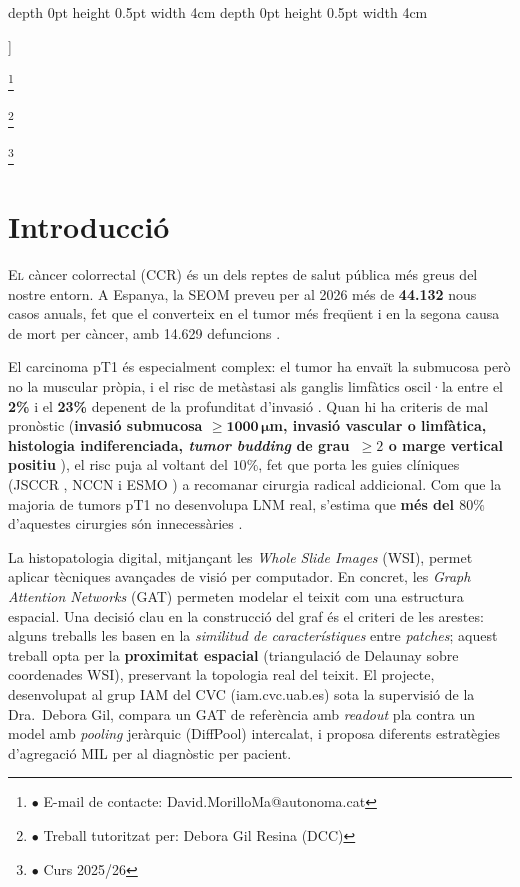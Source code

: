 \documentclass[10pt,a4paper,twocolumn,twoside]{article}
\newcommand\blfootnote[1]{%
  \begingroup
  \renewcommand\thefootnote{}\footnote{#1}%
  \addtocounter{footnote}{-1}%
  \endgroup
}
\begin{document}
\begin{@twocolumnfalse}
\begin{center}
\bigskip

{\vrule depth 0pt height 0.5pt width 4cm\hspace{7.5pt}%
%
\hspace{7.5pt}\vrule depth 0pt height 0.5pt width 4cm\relax}

\end{center}

\bigskip
\end{@twocolumnfalse}]

\blfootnote{$\bullet$ E-mail de contacte: David.MorilloMa@autonoma.cat}
\blfootnote{$\bullet$ Treball tutoritzat per: Debora Gil Resina (DCC)} \blfootnote{$\bullet$ Curs 2025/26}

\section{Introducció}

\lettrine[lines=3]{E}{l} càncer colorrectal (CCR) és un dels reptes de salut pública més greus del nostre
entorn. A Espanya, la SEOM preveu per al 2026 més de \textbf{44.132} nous casos anuals, fet que el converteix en el tumor
més freqüent i en la segona causa de mort per càncer, amb 14.629 defuncions \cite{seom2026}.

El carcinoma pT1 és especialment complex: el tumor ha envaït la submucosa però no la muscular pròpia, i el risc de
metàstasi als ganglis limfàtics oscil·la entre el \textbf{2\%} i el \textbf{23\%} depenent de la profunditat
d'invasió \cite{ParcSalutMar2013}. %
Quan hi ha criteris de mal pronòstic (\textbf{invasió submucosa $\boldsymbol{\geq\!1000\,\mu}$m,
invasió vascular o limfàtica, histologia indiferenciada, \textit{tumor budding} de
grau~$\geq\!2$ o marge vertical positiu} \cite{jsccr2019,dawson2024budding}), el risc puja
al voltant del $10\%$, fet que porta les guies clíniques (JSCCR \cite{jsccr2019}, NCCN i
ESMO \cite{esge2022}) a recomanar cirurgia radical addicional. Com que la majoria de tumors
pT1 no desenvolupa LNM real, s'estima que \textbf{més del $80\%$} d'aquestes cirurgies són
innecessàries \cite{zaffalon2023,MartinezDeJuan2024}.

La histopatologia digital, mitjançant les \textit{Whole Slide Images} (WSI), permet aplicar
tècniques avançades de visió per computador. En concret, les \textit{Graph Attention Networks}
(GAT) \cite{veličković2018graphattentionnetworks} permeten modelar el teixit com una estructura
espacial. Una decisió clau en la construcció del graf és el criteri de les arestes: alguns
treballs les basen en la \textit{similitud de característiques} entre \textit{patches}; aquest
treball opta per la \textbf{proximitat espacial} (triangulació de Delaunay sobre coordenades
WSI), preservant la topologia real del teixit. El projecte, desenvolupat al grup IAM del CVC
(iam.cvc.uab.es) sota la supervisió de la Dra.\ Debora Gil, compara un GAT de referència
amb \textit{readout} pla contra un model amb \textit{pooling} jeràrquic (DiffPool) intercalat,
i proposa diferents estratègies d'agregació MIL per al diagnòstic per pacient.
\end{document}
